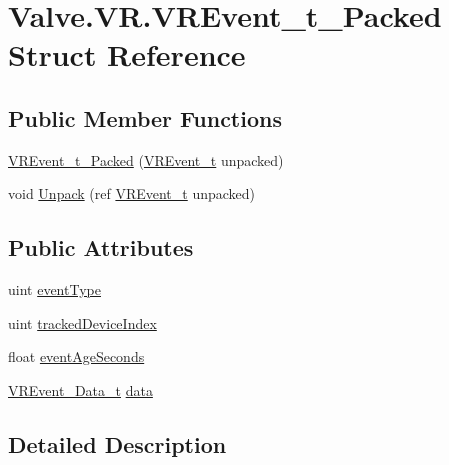 \hypertarget{struct_valve_1_1_v_r_1_1_v_r_event__t___packed}{}\section{Valve.\+V\+R.\+V\+R\+Event\+\_\+t\+\_\+\+Packed Struct Reference}
\label{struct_valve_1_1_v_r_1_1_v_r_event__t___packed}
\subsection*{Public Member Functions}
\begin{DoxyCompactItemize}
\item 
\mbox{\hyperlink{struct_valve_1_1_v_r_1_1_v_r_event__t___packed_a5974e9fe178b8e7955eead90eb9d4973}{V\+R\+Event\+\_\+t\+\_\+\+Packed}} (\mbox{\hyperlink{struct_valve_1_1_v_r_1_1_v_r_event__t}{V\+R\+Event\+\_\+t}} unpacked)
\item 
void \mbox{\hyperlink{struct_valve_1_1_v_r_1_1_v_r_event__t___packed_ae6b562e86a0eb49b9e94fafa7ddf5668}{Unpack}} (ref \mbox{\hyperlink{struct_valve_1_1_v_r_1_1_v_r_event__t}{V\+R\+Event\+\_\+t}} unpacked)
\end{DoxyCompactItemize}
\subsection*{Public Attributes}
\begin{DoxyCompactItemize}
\item 
uint \mbox{\hyperlink{struct_valve_1_1_v_r_1_1_v_r_event__t___packed_aa808c31dfadd58fa1f8dfd497e8dfe3e}{event\+Type}}
\item 
uint \mbox{\hyperlink{struct_valve_1_1_v_r_1_1_v_r_event__t___packed_ab8e9f8705abb3de21f2aba3d80d2e39e}{tracked\+Device\+Index}}
\item 
float \mbox{\hyperlink{struct_valve_1_1_v_r_1_1_v_r_event__t___packed_afb88c5d2e69c5554b93dbb70a9b7f427}{event\+Age\+Seconds}}
\item 
\mbox{\hyperlink{struct_valve_1_1_v_r_1_1_v_r_event___data__t}{V\+R\+Event\+\_\+\+Data\+\_\+t}} \mbox{\hyperlink{struct_valve_1_1_v_r_1_1_v_r_event__t___packed_ae5b6590789a65722738cbe93f9e64a73}{data}}
\end{DoxyCompactItemize}


\subsection{Detailed Description}


